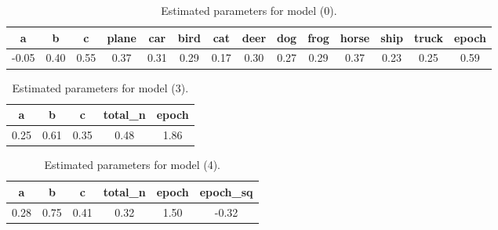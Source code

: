 \documentclass{article} %
\begin{document}

\begin{table}[h!]
\centering
\begin{tabular}{|c|c|c|c|c|c|c|c|c|c|c|c|c|c|}
\hline
           a &         b &         c &    plane &       car &     bird &       cat &      deer &       dog &      frog &     horse &      ship &     truck &     epoch \\
\hline
     -0.05 &  0.40 &  0.55 &  0.37 &  0.31 &  0.29 &  0.17 &  0.30 &  0.27 &  0.29 &  0.37 &  0.23 &  0.25 &  0.59 \\
\hline
\end{tabular}
\caption{Estimated parameters for model (0).}
\label{table:param_values_full_model}
\end{table}

\begin{table}[h!]
    \centering
\begin{tabular}{|c|c|c|c|c|}
    \hline
        a &    b &    c &  total\_n &  epoch \\
    \hline
     0.25 & 0.61 & 0.35 &     0.48 &   1.86 \\
    \hline
\end{tabular}
\caption{Estimated parameters for model (3).}
\label{table:param_values_total_n_epoch}
\end{table}

\begin{table}[h!]
    \centering
\begin{tabular}{|c|c|c|c|c|c|}
\hline
        a &         b &         c &  total\_n &     epoch &  epoch\_sq \\
    \hline
      0.28 &  0.75 &  0.41 &  0.32 &  1.50 & -0.32 \\
    \hline
\end{tabular}
\caption{Estimated parameters for model (4).}
\label{table:param_values_total_n_epoch_sq}
\end{table}
\end{document}

